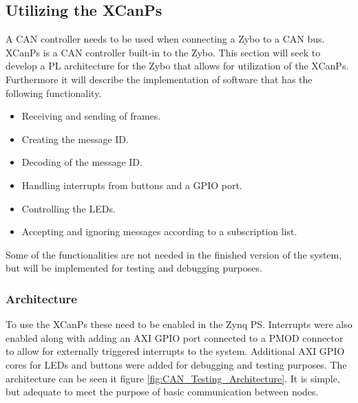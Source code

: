 \subsection{Utilizing the XCanPs}
\label{sub:TestingCANStack_BareMetal}
A CAN controller needs to be used when connecting a Zybo to a CAN bus.
XCanPs is a CAN controller built-in to the Zybo.
This section will seek to develop a PL architecture for the Zybo that allows for utilization of the XCanPs.
Furthermore it will describe the implementation of software that has the following functionality.
\begin{itemize}
\item Receiving and sending of frames.
\item Creating the message ID.
\item Decoding of the message ID.
\item Handling interrupts from buttons and a GPIO port.
\item Controlling the LEDs.
\item Accepting and ignoring messages according to a subscription list.
\end{itemize}
Some of the functionalities are not needed in the finished version of the system, but will be implemented for testing and debugging purposes.

\subsubsection*{Architecture}
To use the XCanPs these need to be enabled in the Zynq PS.
Interrupts were also enabled along with adding an AXI GPIO port connected to a PMOD connector to allow for externally triggered interrupts to the system.
Additional AXI GPIO cores for LEDs and buttons were added for debugging and testing purposes.
The architecture can be seen it figure \ref{fig:CAN_Testing_Architecture}. 
It is simple, but adequate to meet the purpose of basic communication between nodes.

